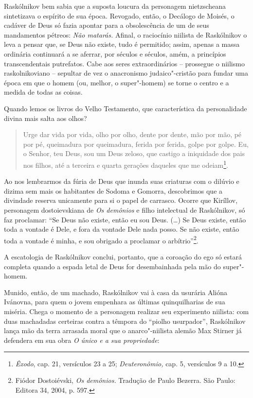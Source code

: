 Raskólnikov bem sabia que a suposta loucura da personagem nietzscheana
sintetizava o espírito de sua época. Revogado, então, o Decálogo de
Moisés, o cadáver de Deus só fazia apontar para a obsolescência de um de
seus mandamentos pétreos: \emph{Não matarás.} Afinal, o raciocínio
niilista de Raskólnikov o leva a pensar que, se Deus não existe, tudo é
permitido; assim, apenas a massa ordinária continuará a se aferrar, por
séculos e séculos, amém, a princípios transcendentais putrefatos. Cabe
aos seres extraordinários -- prossegue o niilismo raskolnikoviano --
sepultar de vez o anacronismo judaico"-cristão para fundar uma época em
que o homem (ou, melhor, o super"-homem) se torne o centro e a medida de
todas as coisas.

Quando lemos os livros do Velho Testamento, que característica da
personalidade divina mais salta aos olhos?

\begin{quote}
Urge dar vida por vida, olho por olho, dente por dente, mão por mão, pé
por pé, queimadura por queimadura, ferida por ferida, golpe por golpe.
Eu, o Senhor, teu Deus, sou um Deus zeloso, que castigo a iniquidade dos
pais nos filhos, até a terceira e quarta gerações daqueles que me
odeiam\footnote{\emph{Êxodo}, cap. 21, versículos 23 a 25;
  \emph{Deuteronômio,} cap. 5, versículos 9 a 10.}.
\end{quote}

Ao nos lembrarmos da fúria de Deus que inunda suas criaturas com o
dilúvio e dizima sem mais os habitantes de Sodoma e Gomorra, descobrimos
que a divindade reserva unicamente para si o papel de carrasco. Ocorre
que Kiríllov, personagem dostoievskiana de \emph{Os demônios} e filho
intelectual de Raskólnikov, só faz proclamar: ``Se Deus não existe,
então eu sou Deus. (\ldots{}) Se Deus existe, então toda a vontade é Dele, e
fora da vontade Dele nada posso. Se não existe, então toda a vontade é
minha, e sou obrigado a proclamar o arbítrio''\footnote{Fiódor
  Dostoiévski, \emph{Os demônios.} Tradução de Paulo Bezerra. São Paulo:
  Editora 34, 2004, p. 597.}.

A escatologia de Raskólnikov conclui, portanto, que a coroação do ego só
estará completa quando a espada letal de Deus for desembainhada pela mão
do super"-homem.

Munido, então, de um machado, Raskólnikov vai à casa da usurária Alióna
Ivánovna, para quem o jovem empenhara as últimas quinquilharias de sua
miséria. Chega o momento de a personagem realizar seu experimento
niilista: com duas machadadas certeiras contra a têmpora do ``piolho
usurpador'', Raskólnikov lança mão da terra arrasada moral que o
anarco"-niilista alemão Max Stirner já defendera em sua obra \emph{O
único e a sua propriedade}:

